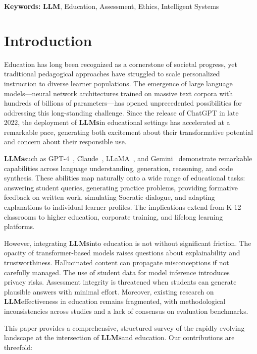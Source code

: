 \documentclass[preprint,12pt]{article}
\newcommand{\LLM}{\textbf{LLM}}
\newcommand{\LLMs}{\textbf{LLMs}}
\theoremstyle{mystyle}
\begin{document}
\noindent\textbf{Keywords:} \LLM, Education, Assessment, Ethics, Intelligent Systems

\newpage
\section{Introduction}
\label{sec:introduction}

Education has long been recognized as a cornerstone of societal progress, yet traditional pedagogical approaches have struggled to scale personalized instruction to diverse learner populations. The emergence of large language models---neural network architectures trained on massive text corpora with hundreds of billions of parameters---has opened unprecedented possibilities for addressing this long-standing challenge. Since the release of ChatGPT in late 2022, the deployment of \LLMs in educational settings has accelerated at a remarkable pace, generating both excitement about their transformative potential and concern about their responsible use.

\LLMs such as GPT-4~\citep{openai2023gpt4}, Claude~\citep{anthropic2023claude}, LLaMA~\citep{touvron2023llama}, and Gemini~\citep{gemini2024gemini} demonstrate remarkable capabilities across language understanding, generation, reasoning, and code synthesis. These abilities map naturally onto a wide range of educational tasks: answering student queries, generating practice problems, providing formative feedback on written work, simulating Socratic dialogue, and adapting explanations to individual learner profiles. The implications extend from K-12 classrooms to higher education, corporate training, and lifelong learning platforms.

However, integrating \LLMs into education is not without significant friction. The opacity of transformer-based models raises questions about explainability and trustworthiness. Hallucinated content can propagate misconceptions if not carefully managed. The use of student data for model inference introduces privacy risks. Assessment integrity is threatened when students can generate plausible answers with minimal effort. Moreover, existing research on \LLM effectiveness in education remains fragmented, with methodological inconsistencies across studies and a lack of consensus on evaluation benchmarks.

This paper provides a comprehensive, structured survey of the rapidly evolving landscape at the intersection of \LLMs and education. Our contributions are threefold:
\end{document}
